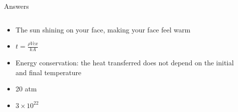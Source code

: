 \documentclass{beamer}
\begin{document}
\begin{frame}{Answers}
\small
\begin{columns}[T]
\begin{column}{0.5\textwidth}
\begin{itemize}
\item The sun shining on your face, making your face feel warm
\item $t = \frac{\rho Vcx}{kA}$
\item Energy conservation: the heat transferred does not depend on the initial and final temperature
\item 20 atm
\item $3 \times 10^{22}$
\end{itemize}
\end{column}
\begin{column}{0.5\textwidth}
\end{column}
\end{columns}
\end{frame}
\end{document}
